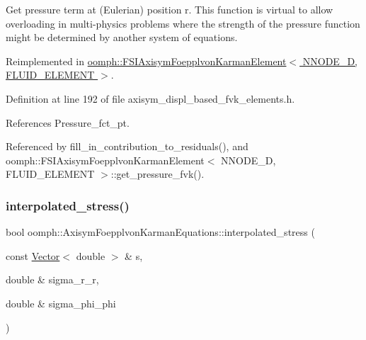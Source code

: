 Get pressure term at (Eulerian) position r. This function is virtual to allow overloading in multi-\/physics problems where the strength of the pressure function might be determined by another system of equations. 



Reimplemented in \hyperlink{classoomph_1_1FSIAxisymFoepplvonKarmanElement_a96b9277c8b9ff3ca40f25851fa30b34e}{oomph\+::\+F\+S\+I\+Axisym\+Foepplvon\+Karman\+Element$<$ N\+N\+O\+D\+E\+\_\+D, F\+L\+U\+I\+D\+\_\+\+E\+L\+E\+M\+E\+N\+T $>$}.



Definition at line 192 of file axisym\+\_\+displ\+\_\+based\+\_\+fvk\+\_\+elements.\+h.



References Pressure\+\_\+fct\+\_\+pt.



Referenced by fill\+\_\+in\+\_\+contribution\+\_\+to\+\_\+residuals(), and oomph\+::\+F\+S\+I\+Axisym\+Foepplvon\+Karman\+Element$<$ N\+N\+O\+D\+E\+\_\+D, F\+L\+U\+I\+D\+\_\+\+E\+L\+E\+M\+E\+N\+T $>$\+::get\+\_\+pressure\+\_\+fvk().

\mbox{\label{classoomph_1_1AxisymFoepplvonKarmanEquations_a3462c52b14649baaea863ea664a41c16}} 
\subsubsection{\texorpdfstring{interpolated\+\_\+stress()}{interpolated\_stress()}\hspace{0.1cm}{\footnotesize\ttfamily [1/2]}}
{\footnotesize\ttfamily bool oomph\+::\+Axisym\+Foepplvon\+Karman\+Equations\+::interpolated\+\_\+stress (\begin{DoxyParamCaption}\item[{const \hyperlink{classoomph_1_1Vector}{Vector}$<$ double $>$ \&}]{s,  }\item[{double \&}]{sigma\+\_\+r\+\_\+r,  }\item[{double \&}]{sigma\+\_\+phi\+\_\+phi }\end{DoxyParamCaption})}



